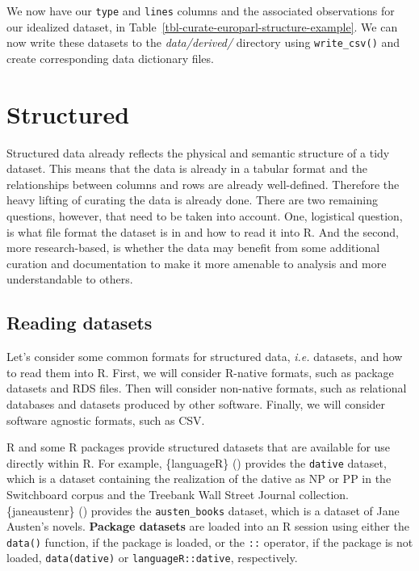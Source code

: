 \documentclass[
  letterpaper,
]{latex/krantz}
\theoremstyle{definition}
\theoremstyle{remark}
\begin{document}
We now have our \texttt{type} and \texttt{lines} columns and the
associated observations for our idealized dataset, in
Table~\ref{tbl-curate-europarl-structure-example}. We can now write
these datasets to the \emph{data/derived/} directory using
\texttt{write\_csv()} and create corresponding data dictionary files.

\section{Structured}\label{structured}

Structured data already reflects the physical and semantic structure of
a tidy dataset. This means that the data is already in a tabular format
and the relationships between columns and rows are already well-defined.
Therefore the heavy lifting of curating the data is already done. There
are two remaining questions, however, that need to be taken into
account. One, logistical question, is what file format the dataset is in
and how to read it into R. And the second, more research-based, is
whether the data may benefit from some additional curation and
documentation to make it more amenable to analysis and more
understandable to others.

\subsection{Reading datasets}\label{reading-datasets}

Let's consider some common formats for structured data, \emph{i.e.}
datasets, and how to read them into R. First, we will consider R-native
formats, such as package datasets and RDS files. Then will consider
non-native formats, such as relational databases and datasets produced
by other software. Finally, we will consider software agnostic formats,
such as CSV.

R and some R packages provide structured datasets that are available for
use directly within R. For example, \{languageR\}
()
provides the \texttt{dative} dataset, which is a dataset containing the
realization of the dative as NP or PP in the Switchboard corpus and the
Treebank Wall Street Journal collection. \{janeaustenr\}
() provides the
\texttt{austen\_books} dataset, which is a dataset of Jane Austen's
novels. \textbf{Package datasets} are loaded into an R session using
either the \texttt{data()} function, if the package is loaded, or the
\texttt{::} operator, if the package is not loaded,
\texttt{data(dative)} or \texttt{languageR::dative}, respectively.
\end{document}
